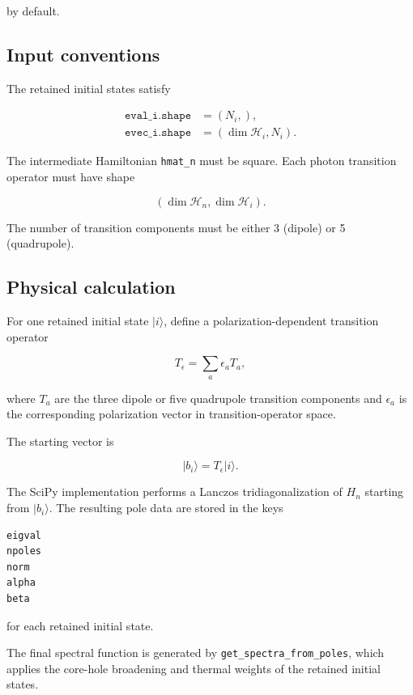 \documentclass[11pt]{article}
\begin{document}
by default.

\subsection{Input conventions}

The retained initial states satisfy

\begin{align}
  \texttt{eval\_i.shape} &= (N_i,),\\
  \texttt{evec\_i.shape} &= (\dim\mathcal H_i,N_i).
\end{align}

The intermediate Hamiltonian \texttt{hmat\_n} must be square.  Each photon transition operator must have shape

\begin{equation}
  (\dim\mathcal H_n,\dim\mathcal H_i).
\end{equation}

The number of transition components must be either 3 (dipole) or 5 (quadrupole).

\subsection{Physical calculation}

For one retained initial state \(|i\rangle\), define a polarization-dependent transition operator

\begin{equation}
  T_{\epsilon}=\sum_a \epsilon_a T_a,
\end{equation}

where \(T_a\) are the three dipole or five quadrupole transition components and \(\epsilon_a\) is the corresponding polarization vector in transition-operator space.

The starting vector is

\begin{equation}
  |b_i\rangle=T_{\epsilon}|i\rangle.
\end{equation}

The SciPy implementation performs a Lanczos tridiagonalization of \(H_n\) starting from \(|b_i\rangle\).  The resulting pole data are stored in the keys

\begin{lstlisting}
eigval
npoles
norm
alpha
beta
\end{lstlisting}

for each retained initial state.

The final spectral function is generated by \texttt{get\_spectra\_from\_poles}, which applies the core-hole broadening and thermal weights of the retained initial states.
\end{document}
